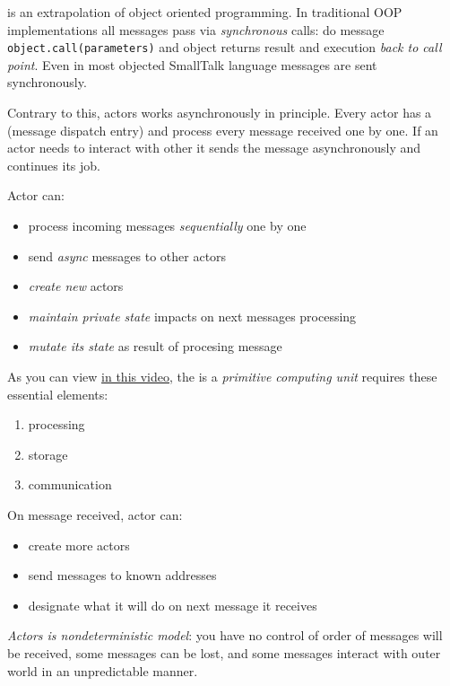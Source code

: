 
 is an extrapolation of object oriented programming. In
traditional OOP implementations all messages pass via \emph{synchronous} calls:
do message \verb|object.call(parameters)| and object returns result and
execution \emph{back to call point}. Even in most objected SmallTalk
language messages are sent synchronously.

Contrary to this, actors works asynchronously in principle. Every actor has a
 (message dispatch entry) and process every message received one
by one. If an actor needs to interact with other it sends the message
asynchronously and continues its job.

\clearpage\noindent
Actor can:
\begin{itemize}[nosep]
  \item process incoming messages \emph{sequentially} one by one
  \item send \emph{async} messages to other actors
  \item \emph{create new} actors
  \item \emph{maintain private state} impacts on next messages processing
  \item \emph{mutate its state} as result of procesing message
\end{itemize}

\clearpage\noindent
As you can view \href{https://www.youtube.com/watch?v=7erJ1DV_Tlo}{in this
video}, the  is a \emph{primitive computing unit} requires these
essential elements:
\begin{enumerate}[nosep]
  \item processing
  \item storage
  \item communication
\end{enumerate} 

\noindent
On message received, actor can:
\begin{itemize}[nosep]
  \item create more actors
  \item send messages to known addresses
  \item designate what it will do on next message it receives
\end{itemize}

\medskip\noindent
\emph{Actors is nondeterministic model}: you have no control of order of
messages will be received, some messages can be lost, and some messages interact
with outer world in an unpredictable manner.
